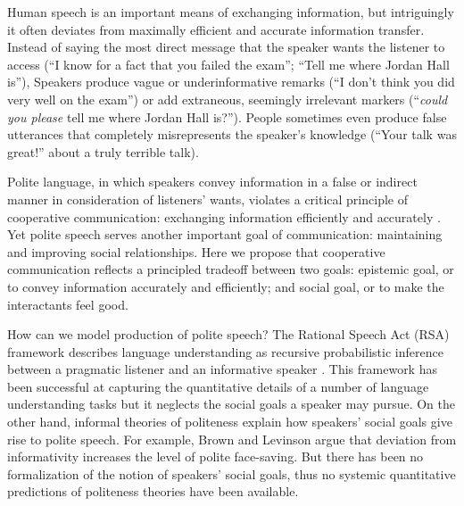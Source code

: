\documentclass[12pt]{article}
\begin{document}
Human speech is an important means of exchanging information, but
intriguingly it often deviates from maximally efficient and accurate
information transfer. Instead of saying the most direct message that the
speaker wants the listener to access (\enquote{I know for a fact that
you failed the exam}; \enquote{Tell me where Jordan Hall is}), Speakers produce
vague or underinformative remarks (\enquote{I don't think you did very
well on the exam}) or add extraneous, seemingly irrelevant markers
(\enquote{\emph{could you please} tell me where Jordan Hall is?}). People sometimes
even produce false utterances that completely misrepresents the
speaker's knowledge (\enquote{Your talk was great!} about a truly
terrible talk).

Polite language, in which speakers convey information in a false or
indirect manner in consideration of listeners' wants, violates a
critical principle of cooperative communication: exchanging information
efficiently and accurately \cite{grice1975}. Yet polite speech serves
another important goal of communication: maintaining and improving
social relationships. Here we propose that cooperative communication
reflects a principled tradeoff between two goals: epistemic goal, or to
convey information accurately and efficiently; and social goal, or to
make the interactants feel good.

How can we model production of polite speech? The Rational Speech Act
(RSA) framework describes language understanding as recursive
probabilistic inference between a pragmatic listener and an informative
speaker \cite{goodman2016}. This framework has been successful at capturing the
quantitative details of a number of language understanding tasks but it
neglects the social goals a speaker may pursue. On the other hand,
informal theories of politeness explain how speakers' social goals give
rise to polite speech. For example, Brown and Levinson \cite{brown1987} argue that
deviation from informativity increases the level of polite face-saving.
But there has been no formalization of the notion of speakers' social
goals, thus no systemic quantitative predictions of politeness theories
have been available.
\end{document}
